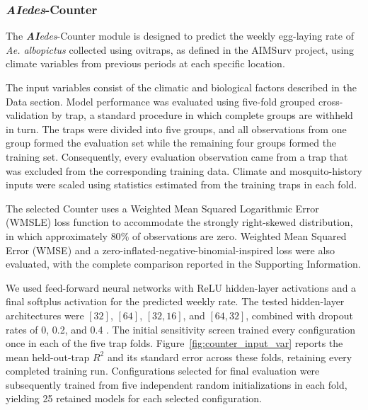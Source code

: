 \documentclass[preprint,12pt]{elsarticle}
\begin{document}
\subsubsection{\textit{\textbf{AI}edes}-Counter}
The \textit{\textbf{AI}edes}-Counter module is designed to predict the weekly egg-laying rate of \emph{Ae. albopictus} collected using ovitraps, as defined in the AIMSurv project, using climate variables from previous periods at each specific location.

The input variables consist of the climatic and biological factors described in the Data section. Model performance was evaluated using five-fold grouped cross-validation by trap, a standard procedure in which complete groups are withheld in turn. The traps were divided into five groups, and all observations from one group formed the evaluation set while the remaining four groups formed the training set. Consequently, every evaluation observation came from a trap that was excluded from the corresponding training data. Climate and mosquito-history inputs were scaled using statistics estimated from the training traps in each fold.

The selected Counter uses a Weighted Mean Squared Logarithmic Error (WMSLE) loss function to accommodate the strongly right-skewed distribution, in which approximately $80\%$ of observations are zero. Weighted Mean Squared Error (WMSE) and a zero-inflated-negative-binomial-inspired loss were also evaluated, with the complete comparison reported in the Supporting Information.

We used feed-forward neural networks with ReLU hidden-layer activations and a final softplus activation for the predicted weekly rate. The tested hidden-layer architectures were $[32]$, $[64]$, $[32,16]$, and $[64,32]$, combined with dropout rates of 0, 0.2, and 0.4 \cite{srivastava2014dropout}. The initial sensitivity screen trained every configuration once in each of the five trap folds. Figure~\ref{fig:counter_input_var} reports the mean held-out-trap $R^2$ and its standard error across these folds, retaining every completed training run. Configurations selected for final evaluation were subsequently trained from five independent random initializations in each fold, yielding 25 retained models for each selected configuration.
\end{document}
